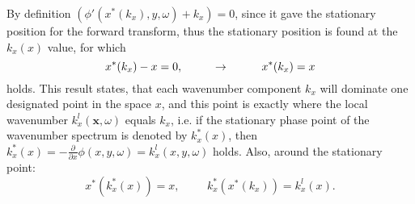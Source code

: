 \documentclass[12pt,a4paper]{article}
\newcommand{\vx}{\mathbf{x}}
\begin{document}
By definition $\left(\phi'(x^*(k_x),y,\omega)+ k_x \right) = 0$, since it gave the stationary position for the forward transform, thus the stationary position is found at the $k_x(x)$ value, for which 
\begin{equation}
x^*(k_x) - x = 0, \hspace{10mm} \rightarrow \hspace{10mm} x^*(k_x) = x
\label{Eq:stat_values}
\end{equation}
holds. This result states, that each wavenumber component $k_x$ will dominate one designated point in the space $x$, and this point is exactly where the local wavenumber $k_x^l(\vx,\omega)$ equals $k_x$, i.e. if the stationary phase point of the wavenumber spectrum is denoted by $k_x^*(x)$, then $k_x^*(x) = -\frac{\partial}{\partial x}\phi(x,y,\omega) = k_x^l(x,y,\omega)$ holds.
Also, around the stationary point:
\begin{equation}
x^*(k_x^*(x))  = x, \hspace{1cm} k_x^*(x^*(k_x)) = k_x^l(x).
\end{equation}
\end{document}
